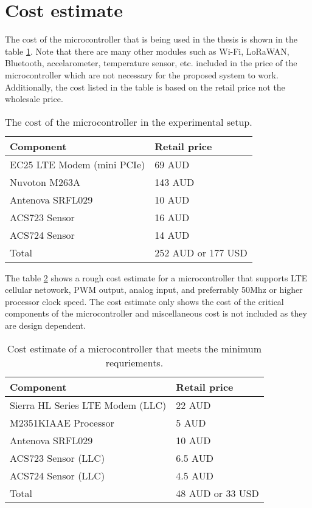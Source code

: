 \documentclass[../thesis.tex]{subfiles}
\begin{document}
\section{Cost estimate}

The cost of the microcontroller that is being used in the thesis is shown in the table \ref{tab:mcestimateexp}. Note that there are many other modules such as Wi-Fi, LoRaWAN, Bluetooth, accelarometer, temperature sensor, etc. included in the price of the microcontroller which are not necessary for the proposed system to work. Additionally, the cost listed in the table is based on the retail price not the wholesale price. 

\begin{table}[h!]
	\begin{center}
		\caption{The cost of the microcontroller in the experimental setup.}
		\label{tab:mcestimateexp}
		\begin{tabular}{l|l}
			\toprule
			\textbf{Component} & \textbf{Retail price}\\
			\midrule
			EC25 LTE Modem (mini PCIe) & 69 AUD\\
			Nuvoton M263A & 143 AUD\\
			Antenova SRFL029 & 10 AUD\\
			ACS723 Sensor & 16 AUD\\
			ACS724 Sensor & 14 AUD\\
			\midrule
			Total & 252 AUD or 177 USD\\
			\bottomrule
		\end{tabular}
	\end{center}
\end{table}

The table \ref{tab:mcestimate} shows a rough cost estimate for a microcontroller that supports LTE cellular netowork, PWM output, analog input, and preferrably 50Mhz or higher processor clock speed. The cost estimate only shows the cost of the critical components of the microcontroller and miscellaneous cost is not included as they are design dependent.

\begin{table}[h!]
	\begin{center}
		\caption{Cost estimate of a microcontroller that meets the minimum requriements.}
		\label{tab:mcestimate}
		\begin{tabular}{l|l}
			\toprule
			\textbf{Component} & \textbf{Retail price}\\
			\midrule
			Sierra HL Series LTE Modem (LLC) & 22 AUD\\
			M2351KIAAE Processor & 5 AUD\\
			Antenova SRFL029 & 10 AUD\\
			ACS723 Sensor (LLC) & 6.5 AUD\\
			ACS724 Sensor (LLC) & 4.5 AUD\\
			\midrule
			Total & 48 AUD or 33 USD\\
			\bottomrule
		\end{tabular}
	\end{center}
\end{table}
\end{document}
